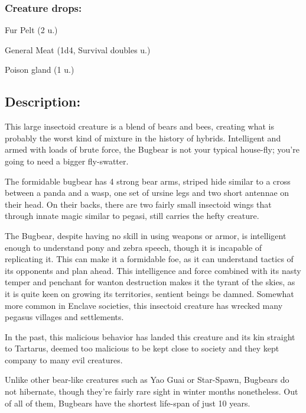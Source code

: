\documentclass[11pt,a4paper,twocolumn]{book}
\begin{document}
	\subsubsection*{Creature drops:}
	\begin{compactitem}
		\item Fur Pelt (2 u.)
		\item General Meat (1d4, Survival doubles u.)
		\item Poison gland (1 u.)
	\end{compactitem}
	
	\subsection*{Description:}
	This large insectoid creature is a blend of bears and bees, creating what is probably the worst kind of mixture in the history of hybrids. Intelligent and armed with loads of brute force, the Bugbear is not your typical house-fly; you're going to need a bigger fly-swatter. 
	
	The formidable bugbear has 4 strong bear arms, striped hide similar to a cross between a panda and a wasp, one set of ursine legs and two short antennae on their head. On their backs, there are two fairly small insectoid wings that through innate magic similar to pegasi, still carries the hefty creature.
	
	The Bugbear, despite having no skill in using weapons or armor, is intelligent enough to understand pony and zebra speech, though it is incapable of replicating it. This can make it a formidable foe, as it can understand tactics of its opponents and plan ahead. This intelligence and force combined with its nasty temper and penchant for wanton destruction makes it the tyrant of the skies, as it is quite keen on growing its territories, sentient beings be damned. Somewhat more common in Enclave societies, this insectoid creature has wrecked many pegasus villages and settlements.
	
	\bigskip
	In the past, this malicious behavior has landed this creature and its kin straight to Tartarus, deemed too malicious to be kept close to society and they kept company to many evil creatures.
	
	Unlike other bear-like creatures such as Yao Guai or Star-Spawn, Bugbears do not hibernate, though they're fairly rare sight in winter months nonetheless. Out of all of them, Bugbears have the shortest life-span of just 10 years.	
	\clearpage
	
\end{document}
